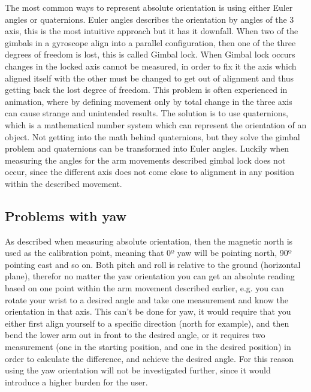 The most common ways to represent absolute orientation is using either Euler angles\cite{euler} or quaternions\cite{quat}. Euler angles describes the orientation by angles of the 3 axis, this is the most intuitive approach but it has it downfall. When two of the gimbals in a gyroscope align into a parallel configuration, then one of the three degrees of freedom is lost, this is called Gimbal lock\cite{gimbal}. When Gimbal lock occurs changes in the locked axis cannot be measured, in order to fix it the axis which aligned itself with the other must be changed to get out of alignment and thus getting back the lost degree of freedom. This problem is often experienced in animation, where by defining movement only by total change in the three axis can cause strange and unintended results. The solution is to use quaternions, which is a mathematical number system which can represent the orientation of an object. Not getting into the math behind quaternions, but they solve the gimbal problem and quaternions can be transformed into Euler angles. Luckily when measuring the angles for the arm movements described gimbal lock does not occur, since the different axis does not come close to alignment in any position within the described movement. 


\subsection{Problems with yaw}
As described when measuring absolute orientation, then the magnetic north is used as the calibration point, meaning that 0º yaw will be pointing north, 90º pointing east and so on. Both pitch and roll is relative to the ground (horizontal plane), therefor no matter the yaw orientation you can get an absolute reading based on one point within the arm movement described earlier, e.g. you can rotate your wrist to a desired angle and take one measurement and know the orientation in that axis. This can't be done for yaw, it would require that you either first align yourself to a specific direction (north for example), and then bend the lower arm out in front to the desired angle, or it requires two measurement (one in the starting position, and one in the desired position) in order to calculate the difference, and achieve the desired angle. For this reason using the yaw orientation will not be investigated further, since it would introduce a higher burden for the user.
